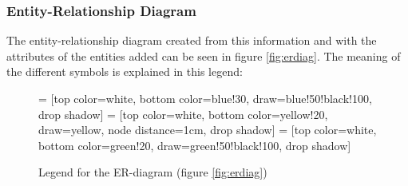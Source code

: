 \documentclass[12pt, a4paper,titlepage]{article}
\begin{document}
\subsubsection{Entity-Relationship Diagram}
The entity-relationship diagram created from this information and with the
attributes of the entities added can be seen in figure \ref{fig:erdiag}. 
The meaning of the different symbols is explained in this legend:
\begin{figure}[H]
\centering
{} = [top color=white, bottom color=blue!30, 
                            draw=blue!50!black!100, drop shadow]
 = [top color=white, bottom color=yellow!20, 
                               draw=yellow, node distance=1cm, drop shadow]
 = [top color=white, bottom color=green!20, 
                                  draw=green!50!black!100, drop shadow]
\caption{Legend for the ER-diagram (figure \ref{fig:erdiag})}
\end{figure}
\end{document}
